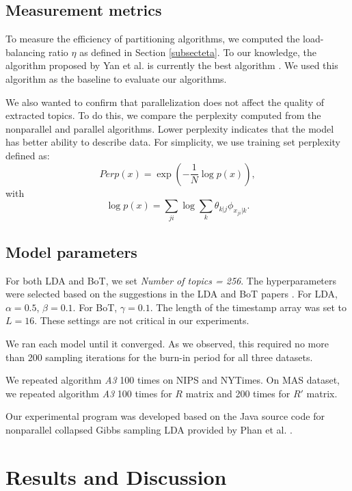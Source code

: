 \documentclass[10pt,conference]{IEEEtran}
\begin{document}
\subsection{Measurement metrics}
To measure the efficiency of partitioning algorithms, we computed the load-balancing ratio $\eta$ as defined in Section \ref{subsecteta}. To our knowledge, the algorithm proposed by Yan et al. is currently the best algorithm \cite{yan2009parallel}. We used this algorithm as the baseline to evaluate our algorithms.

We also wanted to confirm that parallelization does not affect the quality of extracted topics. To do this, we compare the perplexity computed from the nonparallel and parallel algorithms. Lower perplexity indicates that the model has better ability to describe data. For simplicity, we use training set perplexity defined as:
\begin{equation}
Perp(x)=\exp(-\frac{1}{N}\log p(x)),
\end{equation}
with
\begin{equation}
\log p(x) = \sum_{ji}\log\sum_k\theta_{k|j}\phi_{x_{ji}|k}.
\end{equation}

\subsection{Model parameters}
For both LDA and BoT, we set \textit{Number of topics = 256}. The hyperparameters were selected based on the suggestions in the LDA and BoT papers \cite{blei2003latent, masada2009bag}. For LDA, $\alpha = 0.5$, $\beta = 0.1$. For BoT, $\gamma = 0.1$. The length of the timestamp array was set to $L = 16$. These settings are not critical in our experiments.

We ran each model until it converged. As we observed, this required no more than 200 sampling iterations for the burn-in period for all three datasets.

We repeated algorithm \textit{A3} 100 times on NIPS and NYTimes. On MAS dataset, we repeated algorithm \textit{A3} 100 times for $R$ matrix and 200 times for $R'$ matrix.

Our experimental program was developed based on the Java source code for nonparallel collapsed Gibbs sampling LDA provided by Phan et al. \cite{phan2008learning}.

\section{Results and Discussion}
\end{document}
